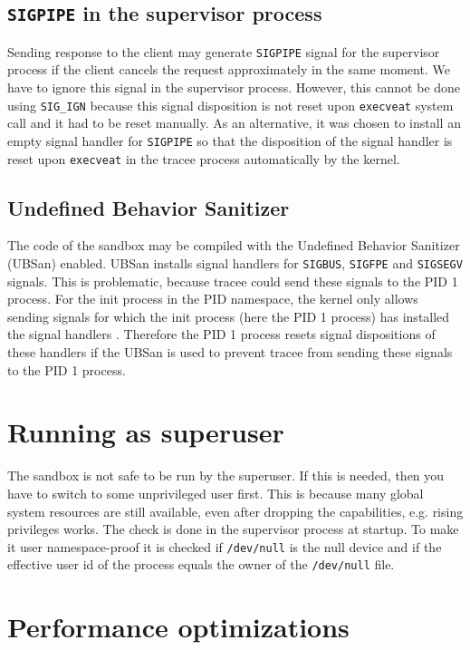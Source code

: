 \documentclass[en]{pracamgr}
\begin{document}
\subsection{\texttt{SIGPIPE} in the supervisor process}

Sending response to the client may generate \texttt{SIGPIPE} signal for the supervisor process if the client cancels the request approximately in the same moment. We have to ignore this signal in the supervisor process. However, this cannot be done using \texttt{SIG\_IGN} because this signal disposition is not reset upon \texttt{execveat} system call and it had to be reset manually. As an alternative, it was chosen to install an empty signal handler for \texttt{SIGPIPE} so that the disposition of the signal handler is reset upon \texttt{execveat} in the tracee process automatically by the kernel.

\subsection{Undefined Behavior Sanitizer}

The code of the sandbox may be compiled with the Undefined Behavior Sanitizer (UBSan) enabled. UBSan installs signal handlers for \texttt{SIGBUS}, \texttt{SIGFPE} and \texttt{SIGSEGV} signals. This is problematic, because tracee could send these signals to the PID 1 process. For the init process in the PID namespace, the kernel only allows sending signals for which the init process (here the PID 1 process) has installed the signal handlers \cite{man_pid_namespaces}. Therefore the PID 1 process resets signal dispositions of these handlers if the UBSan is used to prevent tracee from sending these signals to the PID 1 process.

\section{Running as superuser}

The sandbox is not safe to be run by the superuser. If this is needed, then you have to switch to some unprivileged user first. This is because many global system resources are still available, even after dropping the capabilities, e.g. rising privileges works. The check is done in the supervisor process at startup. To make it user namespace-proof it is checked if \texttt{/dev/null} is the null device and if the effective user id of the process equals the owner of the \texttt{/dev/null} file.

\section{Performance optimizations}
\end{document}
